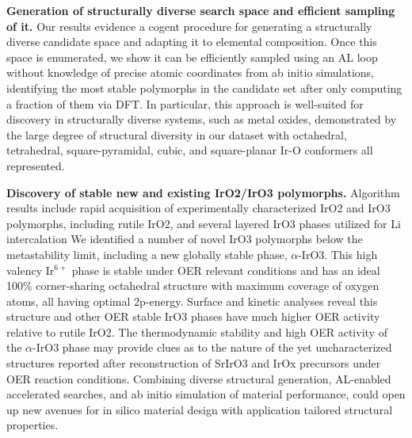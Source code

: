 


%
\textbf{Generation of structurally diverse search space and efficient sampling of it.}
Our results evidence a cogent procedure for generating a structurally diverse candidate space and adapting it to elemental composition.
%
Once this space is enumerated, we show it can be efficiently sampled using an AL loop without knowledge of precise atomic coordinates from ab initio simulations, identifying the most stable polymorphs in the candidate set after only computing a fraction of them via DFT.
%
In particular, this approach is well-suited for discovery in structurally diverse systems, such as metal oxides, demonstrated by the large degree of structural diversity in our dataset with octahedral, tetrahedral,  square-pyramidal,  cubic,  and  square-planar Ir-O conformers all represented.


%
\textbf{Discovery of stable new and existing IrO2/IrO3 polymorphs.}
%
Algorithm results include rapid acquisition of experimentally characterized IrO2 and IrO3 polymorphs, including rutile IrO2, and several layered IrO3 phases utilized for Li intercalation
%
We identified a number of novel IrO3 polymorphs below the metastability limit, including a new globally stable phase, $\alpha$-IrO3.
%
This high valency Ir$^{6+}$ phase is stable under OER relevant conditions and has an ideal 100\% corner-sharing octahedral structure with maximum coverage of oxygen atoms, all having optimal 2p-energy.
%
Surface and kinetic analyses reveal this structure and other OER stable IrO3 phases have much higher OER activity relative to rutile IrO2.
%
The thermodynamic stability and high OER activity of the $\alpha$-IrO3 phase may provide clues as to the nature of the yet uncharacterized structures reported after reconstruction of SrIrO3 and IrOx precursors under OER reaction conditions.
%
Combining diverse structural generation, AL-enabled accelerated searches, and ab initio simulation of material performance, could open up new avenues for in silico material design with application tailored structural properties.






